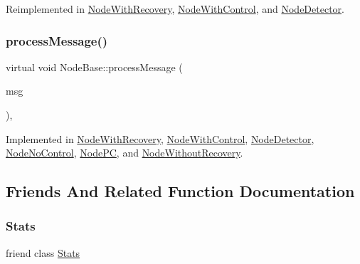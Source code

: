 Reimplemented in \hyperlink{classNodeWithRecovery_a33d8e8775fd69cb647b38a54b36e1ebe}{Node\+With\+Recovery}, \hyperlink{classNodeWithControl_ab871014cf3f42d834f8d34ad5498174c}{Node\+With\+Control}, and \hyperlink{classNodeDetector_af75cf37cc01fc51bc228a7a83c10cb97}{Node\+Detector}.

\mbox{\label{classNodeBase_ae70b168f2bc7407c249594b1c614301c}} 
\subsubsection{\texorpdfstring{process\+Message()}{processMessage()}}
{\footnotesize\ttfamily virtual void Node\+Base\+::process\+Message (\begin{DoxyParamCaption}\item[{c\+Message $\ast$}]{msg }\end{DoxyParamCaption})\hspace{0.3cm}{\ttfamily [protected]}, {}}



Implemented in \hyperlink{classNodeWithRecovery_a216c29d76ddb0e94cd5701ff208c7f5b}{Node\+With\+Recovery}, \hyperlink{classNodeWithControl_af532082fab76c38d8c50ca90e991f4c3}{Node\+With\+Control}, \hyperlink{classNodeDetector_ab69432c6d3327a684845ec231826727e}{Node\+Detector}, \hyperlink{classNodeNoControl_aa83bc408fe3dab03f124ea5489946836}{Node\+No\+Control}, \hyperlink{classNodePC_aa5fedc4136104a06e2f1131f1ba16b0e}{Node\+PC}, and \hyperlink{classNodeWithoutRecovery_a0b44132b4ebc650399711766cb050399}{Node\+Without\+Recovery}.



\subsection{Friends And Related Function Documentation}
\mbox{\label{classNodeBase_a129f65b6976377739eb6231b6962985e}} 
\subsubsection{\texorpdfstring{Stats}{Stats}}
{\footnotesize\ttfamily friend class \hyperlink{classStats}{Stats}\hspace{0.3cm}{\ttfamily [friend]}}



